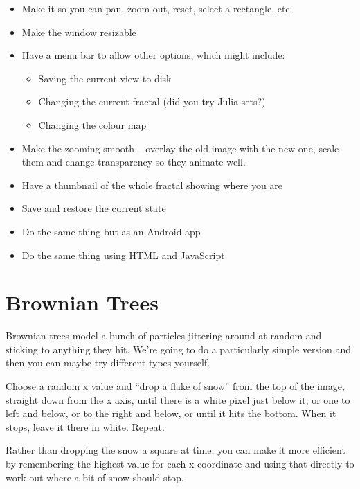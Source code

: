 \documentclass{article}
\begin{document}
            \begin{itemize}
                \item Make it so you can pan, zoom out, reset, select a rectangle, etc.
                \item Make the window resizable
                \item Have a menu bar to allow other options, which might include:
                \begin{itemize}
                    \item Saving the current view to disk
                    \item Changing the current fractal (did you try Julia sets?)
                    \item Changing the colour map
                \end{itemize}
                \item Make the zooming smooth -- overlay the old image with the new one, scale them and change transparency so they animate 
                well.
                \item Have a thumbnail of the whole fractal showing where you are
                \item Save and restore the current state
                \item Do the same thing but as an Android app
                \item Do the same thing using HTML and JavaScript
            \end{itemize}

    \newpage
    \section{Brownian Trees}
        
        Brownian trees model a bunch of particles jittering around at random and sticking to anything they hit. We're going to do a
        particularly simple version and then you can maybe try different types yourself.
        
        Choose a random x value and “drop a flake of snow” from the top of the image, straight down from the x axis, until there is a white
        pixel just below it, or one to left and below, or to the right and below, or until it hits the bottom. When it stops, leave it
        there in white. Repeat.
        
        Rather than dropping the snow a square at time, you can make it more efficient by remembering the highest value for each x
        coordinate and using that directly to work out where a bit of snow should stop.
        
\end{document}
